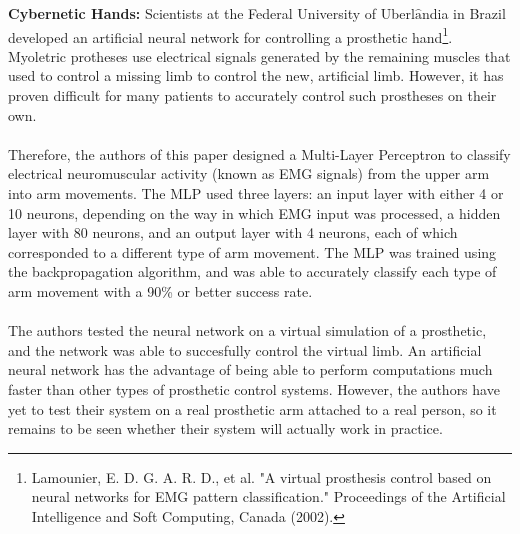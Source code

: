 \documentclass[11pt]{article}
\begin{document}
{\bf Cybernetic Hands:} Scientists at the Federal University of Uberl$\hat{\text{a}}$ndia in Brazil developed an artificial neural network for controlling a prosthetic hand\footnote{Lamounier, E. D. G. A. R. D., et al. "A virtual prosthesis control based on neural networks for EMG pattern classification." Proceedings of the Artificial Intelligence and Soft Computing, Canada (2002).}. Myoletric protheses use electrical signals generated by the remaining muscles that used to control a missing limb to control the new, artificial limb. However, it has proven difficult for many patients to accurately control such prostheses on their own. \\
\\
Therefore, the authors of this paper designed a Multi-Layer Perceptron to classify electrical neuromuscular activity (known as EMG signals) from the upper arm into arm movements. The MLP used three layers: an input layer with either 4 or 10 neurons, depending on the way in which EMG input was processed, a hidden layer with 80 neurons, and an output layer with 4 neurons, each of which corresponded to a different type of arm movement. The MLP was trained using the backpropagation algorithm, and was able to accurately classify each type of arm movement with a 90\% or better success rate. \\
\\
The authors tested the neural network on a virtual simulation of a prosthetic, and the network was able to succesfully control the virtual limb. An artificial neural network has the advantage of being able to perform computations much faster than other types of prosthetic control systems. However, the authors have yet to test their system on a real prosthetic arm attached to a real person, so it remains to be seen whether their system will actually work in practice.
\end{document}
